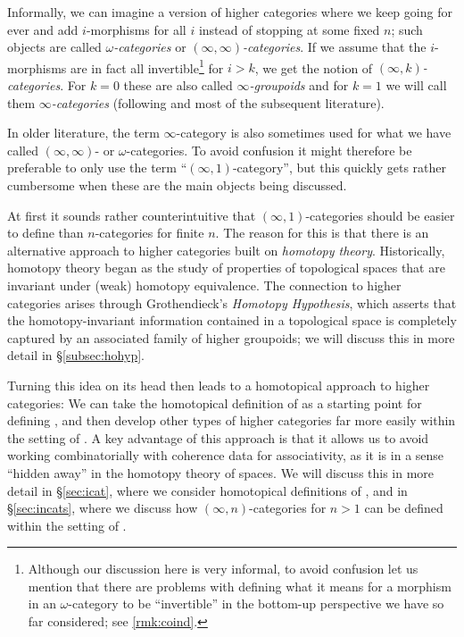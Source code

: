 \documentclass[a4paper,12pt]{article}
\begin{document}
Informally, we can imagine a version of higher categories where we
keep going for ever and add $i$-morphisms for all $i$ instead of
stopping at some fixed $n$; such objects are called
\emph{$\omega$-categories} or \emph{$(\infty,\infty)$-categories}. If
we assume that the $i$-morphisms are in fact all
invertible\footnote{Although our discussion here is very informal, to
  avoid confusion let us mention that there are problems with
  defining what it means for a morphism in an $\omega$-category to be
  ``invertible'' in the bottom-up perspective we have so far
  considered; see \cref{rmk:coind}.}  for $i > k$, we get the notion
of \emph{$(\infty,k)$-categories}. For $k = 0$ these are also called
\emph{$\infty$-groupoids} and for $k = 1$ we will call them
\emph{$\infty$-categories} (following \cite{HTT} and most of the
subsequent literature).

\begin{warning}
  In older literature, the term $\infty$-category is also sometimes
  used for what we have called $(\infty,\infty)$- or
  $\omega$-categories. To avoid confusion it might therefore be
  preferable to only use the term ``$(\infty,1)$-category'', but this
  quickly gets rather cumbersome when these are the main objects being
  discussed.
\end{warning}

At first it sounds rather counterintuitive that
$(\infty,1)$-categories should be easier to define than $n$-categories
for finite $n$. The reason for this is that there is an alternative
approach to higher categories built on \emph{homotopy
  theory}. Historically, homotopy theory began as the study of
properties of topological spaces that are invariant under (weak)
homotopy equivalence. The connection to higher categories arises
through Grothendieck's \emph{Homotopy Hypothesis}, which asserts that
the homotopy-invariant information contained in a topological space is
completely captured by an associated family of higher groupoids; we
will discuss this in more detail in \S\ref{subsec:hohyp}.

Turning this idea on its head then leads to a homotopical approach to
higher categories: We can take the homotopical definition of
\igpds{} as a starting point for defining \icats{}, and then
develop other types of higher categories far more easily within the
setting of \icats{}. A key advantage of this approach is that it
allows us to avoid working combinatorially with coherence data for
associativity, as it is in a sense ``hidden away'' in the homotopy
theory of spaces. We will discuss this in more detail in
\S\ref{sec:icat}, where we consider homotopical definitions of
\icats{}, and in \S\ref{sec:incats}, where we discuss
how $(\infty,n)$-categories for $n > 1$ can be defined within the
setting of \icats{}.
\end{document}
